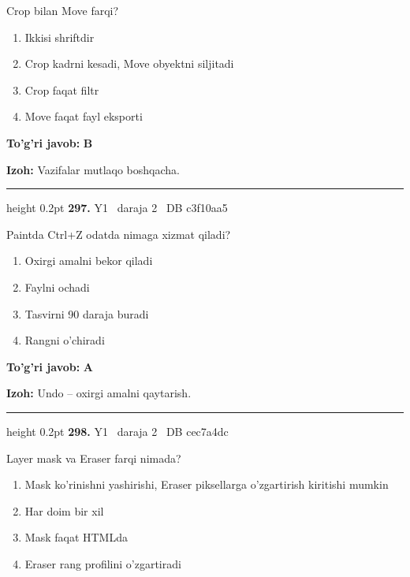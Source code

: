 \documentclass[10pt,a4paper,oneside]{article}
\begin{document}
Crop bilan Move farqi?
\begin{enumerate}[label=\Alph*),leftmargin=9mm]
\item Ikkisi shriftdir
\item Crop kadrni kesadi, Move obyektni siljitadi
\item Crop faqat filtr
\item Move faqat fayl eksporti
\end{enumerate}
\begin{tcolorbox}[enhanced,breakable,colback=teal!4,colframe=teal!45!black,boxrule=0.45pt,arc=1.2mm,left=2.8mm,right=2.8mm,top=2mm,bottom=2mm,before skip=2mm,after skip=2mm]
\textbf{\color{teal}To'g'ri javob:} \textbf{B}
\par\smallskip
\textbf{Izoh:} Vazifalar mutlaqo boshqacha.
\end{tcolorbox}
\vspace{2mm}\hrule height 0.2pt \vspace{4mm}
\hypertarget{q297}{\textbf{\color{ink}297.}}  {\color{muted}\scriptsize Y1 \textbullet\ daraja 2 \textbullet\ DB c3f10aa5}
\par
Paintda Ctrl+Z odatda nimaga xizmat qiladi?
\begin{enumerate}[label=\Alph*),leftmargin=9mm]
\item Oxirgi amalni bekor qiladi
\item Faylni ochadi
\item Tasvirni 90 daraja buradi
\item Rangni o'chiradi
\end{enumerate}
\begin{tcolorbox}[enhanced,breakable,colback=teal!4,colframe=teal!45!black,boxrule=0.45pt,arc=1.2mm,left=2.8mm,right=2.8mm,top=2mm,bottom=2mm,before skip=2mm,after skip=2mm]
\textbf{\color{teal}To'g'ri javob:} \textbf{A}
\par\smallskip
\textbf{Izoh:} Undo -- oxirgi amalni qaytarish.
\end{tcolorbox}
\vspace{2mm}\hrule height 0.2pt \vspace{4mm}
\hypertarget{q298}{\textbf{\color{ink}298.}}  {\color{muted}\scriptsize Y1 \textbullet\ daraja 2 \textbullet\ DB cec7a4dc}
\par
Layer mask va Eraser farqi nimada?
\begin{enumerate}[label=\Alph*),leftmargin=9mm]
\item Mask ko'rinishni yashirishi, Eraser piksellarga o'zgartirish kiritishi mumkin
\item Har doim bir xil
\item Mask faqat HTMLda
\item Eraser rang profilini o'zgartiradi
\end{enumerate}
\end{document}
